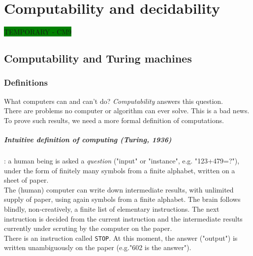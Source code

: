 \chapter{Computability and decidability}

\colorbox{green}{TEMPORARY - CM9}

\section{Computability and Turing machines}

\subsection{Definitions}
What computers can and can't do? \emph{Computability} answers this question.\\
There are problems no computer or algorithm can ever solve. This is a bad news.\\
To prove such results, we need a more formal definition of computations.

\paragraph*{Intuitive definition of computing (Turing, 1936)}: a human being is asked a \emph{question} ("input" or "instance", e.g. "123+479=?"), under the form of finitely many symbols from a finite alphabet, written on a sheet of paper.\\
The (human) computer can write down intermediate results, with unlimited supply of paper, using again symbols from a finite alphabet. The brain follows blindly, non-creatively, a finite list of elementary instructions. The next instruction is decided from the current instruction and the intermediate results currently under scruting by the computer on the paper.\\
There is an instruction called \texttt{STOP}. At this moment, the answer ("output") is written unambiguously on the paper (e.g."602 is the answer").

